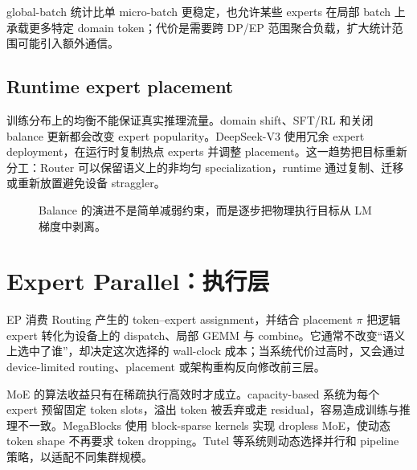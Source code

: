 \documentclass[10pt,a4paper,fontset=none]{ctexart}
\begin{document}
global-batch 统计比单 micro-batch 更稳定，也允许某些 experts 在局部 batch 上承载更多特定 domain token；代价是需要跨 DP/EP 范围聚合负载，扩大统计范围可能引入额外通信。

\subsection{Runtime expert placement}

训练分布上的均衡不能保证真实推理流量。domain shift、SFT/RL 和关闭 balance 更新都会改变 expert popularity。DeepSeek-V3 使用冗余 expert deployment，在运行时复制热点 experts 并调整 placement\cite{zh:deepseekv3}。这一趋势把目标重新分工：Router 可以保留语义上的非均匀 specialization，runtime 通过复制、迁移或重新放置避免设备 straggler。

\begin{figure}[htbp]
\centering
{}
\caption{Balance 的演进不是简单减弱约束，而是逐步把物理执行目标从 LM 梯度中剥离。}
\label{zh:fig:balance}
\end{figure}

\section{Expert Parallel：执行层}

EP 消费 Routing 产生的 token--expert assignment，并结合 placement $\pi$ 把逻辑 expert 转化为设备上的 dispatch、局部 GEMM 与 combine。它通常不改变“语义上选中了谁”，却决定这次选择的 wall-clock 成本；当系统代价过高时，又会通过 device-limited routing、placement 或架构重构反向修改前三层。

MoE 的算法收益只有在稀疏执行高效时才成立。capacity-based 系统为每个 expert 预留固定 token slots，溢出 token 被丢弃或走 residual，容易造成训练与推理不一致。MegaBlocks 使用 block-sparse kernels 实现 dropless MoE，使动态 token shape 不再要求 token dropping\cite{zh:gale2022megablocks}。Tutel 等系统则动态选择并行和 pipeline 策略，以适配不同集群规模\cite{zh:hwang2022tutel}。
\end{document}

